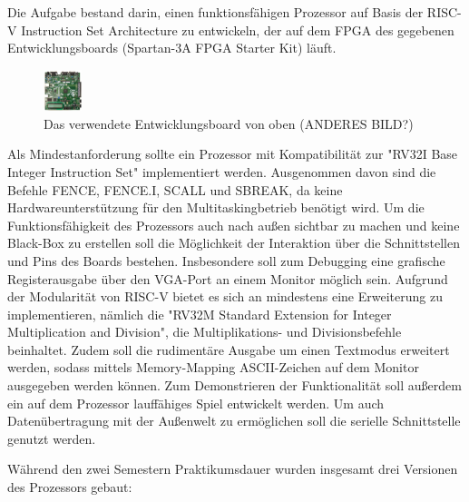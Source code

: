 Die Aufgabe bestand darin, einen funktionsf\"ahigen Prozessor auf Basis der RISC-V Instruction Set Architecture zu entwickeln, der auf dem FPGA des gegebenen Entwicklungsboards (Spartan-3A FPGA Starter Kit) l\"auft. 
\begin{figure}[H]
	\centering
		\includegraphics[width=0.1\textwidth]{Board.png}
	\caption{Das verwendete Entwicklungsboard von oben  (ANDERES BILD?)}
	\label{fig:board}
\end{figure}
Als Mindestanforderung sollte ein Prozessor mit Kompatibilit\"at zur "RV32I Base Integer Instruction Set" implementiert werden. Ausgenommen davon sind die Befehle FENCE, FENCE.I, SCALL und SBREAK, da keine Hardwareunterst\"utzung f\"ur den Multitaskingbetrieb ben\"otigt wird.
Um die Funktionsf\"ahigkeit des Prozessors auch nach au{\ss}en sichtbar zu machen und keine Black-Box zu erstellen soll die M\"oglichkeit der Interaktion \"uber die Schnittstellen und Pins des Boards bestehen. Insbesondere soll zum Debugging eine grafische Registerausgabe \"uber den VGA-Port an einem Monitor m\"oglich sein.
Aufgrund der Modularit\"at von RISC-V bietet es sich an mindestens eine Erweiterung zu implementieren, n\"amlich die "RV32M Standard Extension for Integer Multiplication and Division", die Multiplikations- und Divisionsbefehle beinhaltet. Zudem soll die rudiment\"are Ausgabe um einen Textmodus erweitert werden, sodass mittels Memory-Mapping ASCII-Zeichen auf dem Monitor ausgegeben werden k\"onnen. Zum Demonstrieren der Funktionalit\"at soll au{\ss}erdem ein auf dem Prozessor lauff\"ahiges Spiel entwickelt werden. Um auch Daten\"ubertragung mit der Au{\ss}enwelt zu erm\"oglichen soll die serielle Schnittstelle genutzt werden.

W\"ahrend den zwei Semestern Praktikumsdauer wurden insgesamt drei Versionen des Prozessors gebaut:


